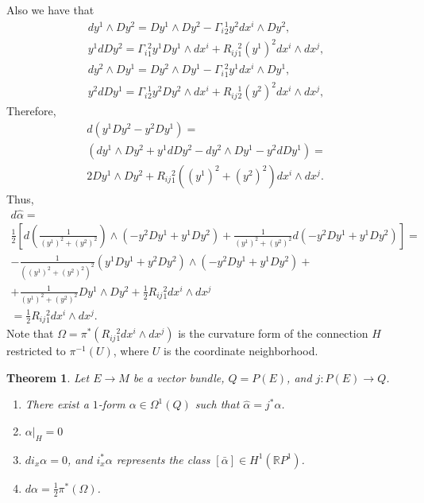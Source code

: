 \documentclass[12pt,letterpaper]{amsart}
\theoremstyle{definition}
\theoremstyle{plain}
\newtheorem{thm}{Theorem}
\theoremstyle{remark}
\begin{document}
Also we have that
\begin{equation}
\begin{array}{l}
dy^1 \wedge Dy^2 = Dy^1 \wedge Dy^2 - \Gamma_i{}^1_2 y^2 dx^i \wedge Dy^2,
\\[5pt]
y^1 d Dy^2 = \Gamma_i{}^2_1 y^1 Dy^1 \wedge dx^i + R_{ij}{ }^2_1 (y^1)^2 dx^i \wedge dx^j,
\\[5pt]
dy^2 \wedge Dy^1 = Dy^2 \wedge Dy^1 - \Gamma_i{}^2_1 y^1 dx^i \wedge Dy^1,
\\[5pt]
y^2 d Dy^1 = \Gamma_i{}^1_2 y^2 Dy^2 \wedge dx^i + R_{ij}{ }^1_2 (y^2)^2 dx^i \wedge dx^j,
\end{array}
\label{eq:70}
\end{equation}
Therefore,
\begin{multline}
d (y^1 Dy^2 - y^2 Dy^1) =
\\
\left( d y^1 \wedge Dy^2 + y^1 d D y^2 - dy^2 \wedge Dy^1 - y^2 d Dy^1 \right) =
\\
2 Dy^1 \wedge Dy^2 + R_{ij}{}^2_1 \left( (y^1)^2 + (y^2)^2 \right) dx^i \wedge dx^j.
\label{eq:71}
\end{multline}
Thus,
\begin{multline}
d \hat{\alpha} =
\\
\frac{1}{2} \left[ d\left(\frac{1}{(y^1)^2 + (y^2)^2}\right) \wedge \left( -y^2 Dy^1 + y^1 Dy^2 \right) + \frac{1}{(y^1)^2 + (y^2)^2} d\left( -y^2 Dy^1 + y^1 Dy^2 \right) \right] =
\\
- \frac{1}{((y^1)^2 +(y^2)^2)^2} \left( y^1 Dy^1 +y^2 Dy^2 \right) \wedge \left( -y^2 Dy^1 +y^1 Dy^2 \right) +
\\
+ \frac{1}{(y^1)^2 + (y^2)^2} Dy^1 \wedge Dy^2 + \frac{1}{2} R_{ij}{}^2_1 dx^i \wedge dx^j
\\
= \frac{1}{2} R_{ij}{}^2_1 dx^i \wedge dx^j.
\label{eq:72}
\end{multline}
Note that $\Omega = \pi^*(R_{ij}{}^2_1 dx^i \wedge dx^j)$ is the curvature form of the connection $H$ restricted to $\pi^{-1}(U)$, where $U$ is the coordinate neighborhood.
\begin{thm}
Let $E \to M$ be a vector bundle, $Q = P(E)$, and $j : P(E) \to Q$.
\begin{enumerate}
\item
There exist a $1$-form $\alpha \in \Omega^1(Q)$ such that $\hat{\alpha} = j^* \alpha$.
\item
$\left.\alpha\right|_H = 0$
\item
$d i_x \alpha = 0$, and $i_x^*\alpha$ represents the class $[\bar \alpha] \in H^1(\mathbb{R}P^1)$.
\item
$d\alpha = \frac{1}{2} \pi^*(\Omega)$.
\end{enumerate}
\label{thm:3}
\end{thm}
\end{document}
